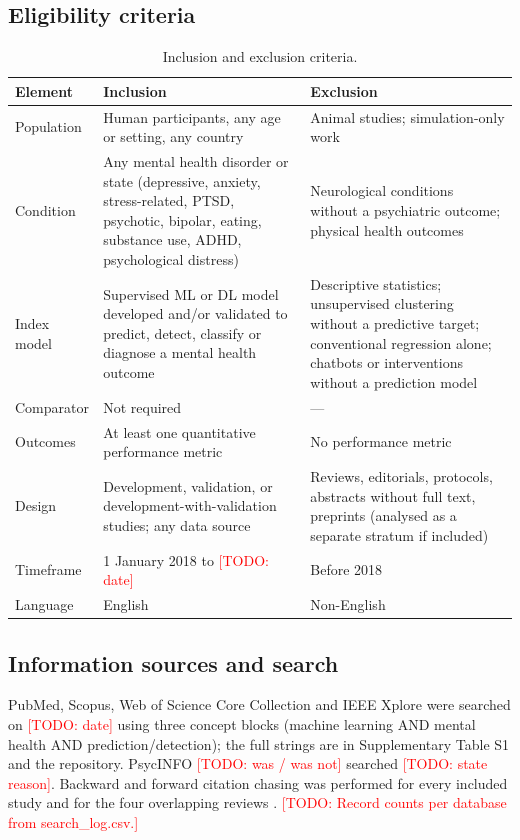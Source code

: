 \documentclass[11pt,a4paper]{article}
\newcommand{\todo}[1]{\textcolor{red}{[TODO: #1]}}
\begin{document}
\subsection{Eligibility criteria}
\begin{table}[!htbp]\centering\caption{Inclusion and exclusion criteria.}\label{tab:criteria}\footnotesize
\begin{tabularx}{\linewidth}{@{}p{2.2cm} L L@{}}\toprule
\textbf{Element} & \textbf{Inclusion} & \textbf{Exclusion}\\\midrule
Population & Human participants, any age or setting, any country & Animal studies; simulation-only work\\
Condition & Any mental health disorder or state (depressive, anxiety, stress-related, PTSD, psychotic, bipolar, eating, substance use, ADHD, psychological distress) & Neurological conditions without a psychiatric outcome; physical health outcomes\\
Index model & Supervised ML or DL model developed and/or validated to predict, detect, classify or diagnose a mental health outcome & Descriptive statistics; unsupervised clustering without a predictive target; conventional regression alone; chatbots or interventions without a prediction model\\
Comparator & Not required & ---\\
Outcomes & At least one quantitative performance metric & No performance metric\\
Design & Development, validation, or development-with-validation studies; any data source & Reviews, editorials, protocols, abstracts without full text, preprints (analysed as a separate stratum if included)\\
Timeframe & 1 January 2018 to \todo{date} & Before 2018\\
Language & English & Non-English\\
\bottomrule\end{tabularx}\end{table}

\subsection{Information sources and search}
PubMed, Scopus, Web of Science Core Collection and IEEE Xplore were searched on \todo{date}
using three concept blocks (machine learning AND mental health AND prediction/detection); the
full strings are in Supplementary Table S1 and the repository. PsycINFO \todo{was / was not}
searched \todo{state reason}. Backward and forward citation chasing was performed for every
included study and for the four overlapping reviews \cite{hasan2026,meehan2022,molpsych2025,madububambachu2024}.
\todo{Record counts per database from search\_log.csv.}
\end{document}
